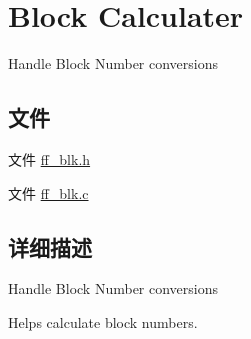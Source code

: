 \hypertarget{group___b_l_k}{}\section{Block Calculater}
\label{group___b_l_k}


Handle Block Number conversions  


\subsection*{文件}
\begin{DoxyCompactItemize}
\item 
文件 \hyperlink{ff__blk_8h}{ff\+\_\+blk.\+h}
\item 
文件 \hyperlink{ff__blk_8c}{ff\+\_\+blk.\+c}
\end{DoxyCompactItemize}


\subsection{详细描述}
Handle Block Number conversions 

Helps calculate block numbers. 